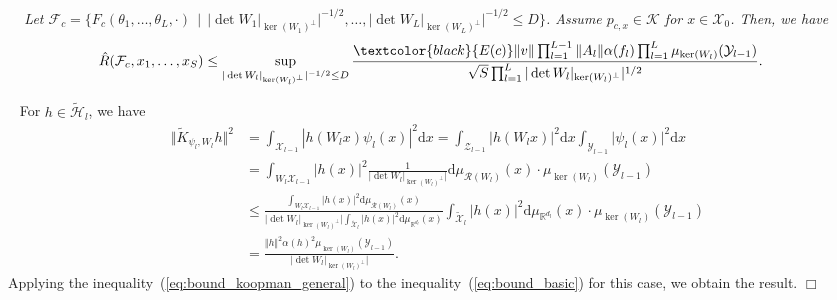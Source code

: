 \documentclass[twoside]{article}
\newenvironment{proof}[1][Proof\ ]{\medskip\noindent{\bf #1}\ }{%
\hfill $\Box$\par\quad\par}
\def\mcl#1{\mathcal{#1}}
\def\hil{\mcl{H}}
\def\nn{\nonumber}
\def\opn{\operatorname}
\def\mr{\mathrm}
\def\red#1{\textcolor{black}{#1}}
\def\eqref#1{(\ref{#1})}
\newenvironment{mythm}[1][]{\medskip\par\noindent{\bfseries #1}\ \,\,\em}{\medskip\par}
\begin{document}
\begin{mythm}[Theorem~\ref{thm:bound_general}]
Let $\mcl{F}_c=\{F_c(\theta_1,\ldots,\theta_L,\cdot)\,\mid\,\vert\det{W_1\vert_{\opn{ker}(W_1)^{\perp}}}\vert^{-1/2},\ldots,\vert\det{W_L\vert_{\opn{ker}(W_L)^{\perp}}}\vert^{-1/2}\le D\}$.
Assume $p_{c,x}\in\mcl{K}$ for $x\in \mcl{X}_0$.
Then, we have
\begin{align*}
 \hat{R}(\mcl{F}_c,x_1,\ldots,x_S)&\le \sup_{\vert\det{W_l}\vert_{\opn{ker}(W_l)^{\perp}}\vert^{-1/2}\le D}\frac{\red{E(c)}\Vert v\Vert\prod_{l=1}^{L-1}\Vert A_l\Vert  \alpha(f_l)\prod_{l=1}^L\mu_{\opn{ker}(W_l)}(\mcl{Y}_{l-1})}{\sqrt{S}\prod_{l=1}^L\vert\det W_l\vert_{\opn{ker}(W_l)^{\perp}}\vert^{1/2}}.
 \end{align*}
\end{mythm}
\begin{proof}
For $h\in\tilde{\hil}_{l}$, we have 
\begin{align}
\Vert \tilde{K}_{\psi_l,W_l} h\Vert^2 &= \int_{\mcl{X}_{l-1}} |h(W_lx)\psi_l(x)|^2 \mr{d}x = \int_{\mcl{Z}_{l-1}} |h(W_lx)|^2 \mr{d}x\int_{\mcl{Y}_{l-1}}\vert \psi_l(x)\vert^2 \mr{d}x\nn\\
&= \int_{W_l\mcl{X}_{l-1}} |h(x)|^2 \frac{1}{\vert\det W_l\vert_{\opn{ker}(W_l)^{\perp}}\vert} \mr{d}\mu_{\mcl{R}(W_l)}(x) \cdot\mu_{\opn{ker}(W_l)}(\mcl{Y}_{l-1} )\nn\\
& \le \frac{\int_{W_l\mcl{X}_{l-1}} |h(x)|^2\mr{d}\mu_{\mcl{R}(W_l)}(x)}{\vert\det W_l\vert_{\opn{ker}(W_l)^{\perp}}\vert\int_{\tilde{\mcl{X}}_{l}} |h(x)|^2 \mr{d}\mu_{\mathbb{R}^{d_l}}(x)}\int_{\tilde{\mcl{X}}_{l}} |h(x)|^2 \mr{d}\mu_{\mathbb{R}^{d_l}}(x)\cdot\mu_{\opn{ker}(W_l)}(\mcl{Y}_{l-1})\nn\\ 
&= \frac{\Vert h\Vert^2\alpha(h)^2\mu_{\opn{ker}(W_l)}(\mcl{Y}_{l-1})}{\vert\det W_l\vert_{\opn{ker}(W_l)^{\perp}}\vert}. \label{eq:bound_koopman_general}
\end{align} 
Applying the inequality~\eqref{eq:bound_koopman_general} to the inequality~\eqref{eq:bound_basic} for this case, we obtain the result.
\end{proof}
\end{document}
